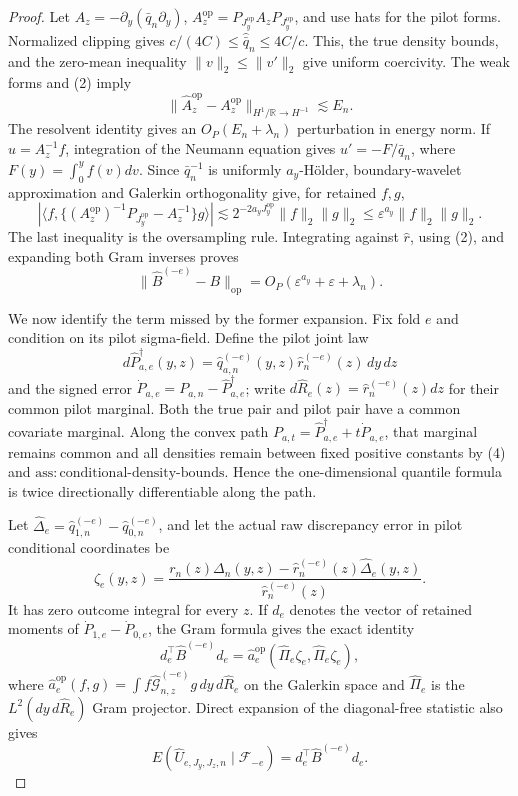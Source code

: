 \documentclass{article}
\begin{document}
\begin{proof}
Let \(A_z=-\partial_y(\bar q_n\partial_y)\), \(A_z^{\mathrm{op}}=P_{J_y^{\mathrm{op}}}A_zP_{J_y^{\mathrm{op}}}\), and use hats for the pilot forms. Normalized clipping gives \(c/(4C)\le\widehat{\bar q}_n\le4C/c\). This, the true density bounds, and the zero-mean inequality \(\|v\|_2\le\|v'\|_2\) give uniform coercivity. The weak forms and (2) imply
\[
\|\widehat A_z^{\mathrm{op}}-A_z^{\mathrm{op}}\|_{H^1/\mathbb R\to H^{-1}}
\lesssim E_n.                                                     \tag{6}
\]
The resolvent identity gives an \(O_P(E_n+\lambda_n)\) perturbation in energy norm. If \(u=A_z^{-1}f\), integration of the Neumann equation gives \(u'=-F/\bar q_n\), where \(F(y)=\int_0^yf(v)dv\). Since \(\bar q_n^{-1}\) is uniformly \(a_y\)-H\"older, boundary-wavelet approximation and Galerkin orthogonality give, for retained \(f,g\),
\[
|\langle f,\{(A_z^{\mathrm{op}})^{-1}P_{J_y^{\mathrm{op}}}-A_z^{-1}\}g\rangle|
\lesssim2^{-2a_yJ_y^{\mathrm{op}}}\|f\|_2\|g\|_2
\le\varepsilon^{a_y}\|f\|_2\|g\|_2.                           \tag{7}
\]
The last inequality is the oversampling rule. Integrating against \(\widehat r\), using (2), and expanding both Gram inverses proves
\[
\|\widehat B^{(-e)}-B\|_{\mathrm{op}}
=O_P(\varepsilon^{a_y}+\varepsilon+\lambda_n).                   \tag{8}
\]

We now identify the term missed by the former expansion. Fix fold \(e\) and condition on its pilot sigma-field. Define the pilot joint law
\[
d\widehat P_{a,e}^{\dagger}(y,z)
=\widehat q_{a,n}^{(-e)}(y,z)\widehat r_n^{(-e)}(z)\,dy\,dz
\]
and the signed error \(\dot P_{a,e}=P_{a,n}-\widehat P_{a,e}^{\dagger}\); write \(d\widehat R_e(z)=\widehat r_n^{(-e)}(z)dz\) for their common pilot marginal. Both the true pair and pilot pair have a common covariate marginal.  Along the convex path \(P_{a,t}=\widehat P_{a,e}^{\dagger}+t\dot P_{a,e}\), that marginal remains common and all densities remain between fixed positive constants by (4) and \(\mathrm{ass{:}conditional\text{-}density\text{-}bounds}\). Hence the one-dimensional quantile formula is twice directionally differentiable along the path.

Let \(\widehat\Delta_e=\widehat q_{1,n}^{(-e)}-\widehat q_{0,n}^{(-e)}\), and let the actual raw discrepancy error in pilot conditional coordinates be
\[
\zeta_e(y,z)
=\frac{r_n(z)\Delta_n(y,z)-\widehat r_n^{(-e)}(z)\widehat\Delta_e(y,z)}
{\widehat r_n^{(-e)}(z)}.                                        \tag{9}
\]
It has zero outcome integral for every \(z\). If \(d_e\) denotes the vector of retained moments of \(\dot P_{1,e}-\dot P_{0,e}\), the Gram formula gives the exact identity
\[
d_e^\top\widehat B^{(-e)}d_e
=\widehat a_e^{\mathrm{op}}(\widehat\Pi_e\zeta_e,\widehat\Pi_e\zeta_e),       \tag{10}
\]
where \(\widehat a_e^{\mathrm{op}}(f,g)=\int f\widehat{\mathcal G}_{n,z}^{(-e)}g\,dy\,d\widehat R_e\) on the Galerkin space and \(\widehat\Pi_e\) is the \(L^2(dy\,d\widehat R_e)\) Gram projector. Direct expansion of the diagonal-free statistic also gives
\[
E(\widehat U_{e,J_y,J_z,n}\mid\mathscr F_{-e})
=d_e^\top\widehat B^{(-e)}d_e.                                  \tag{11}
\]


\end{proof}
\end{document}

